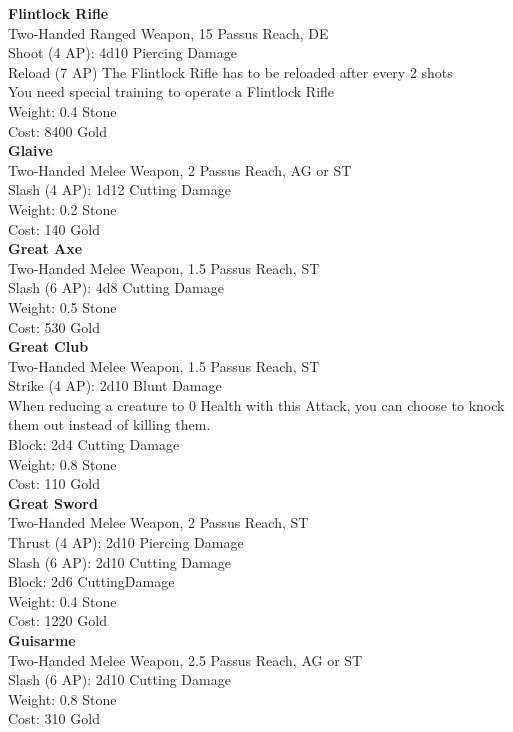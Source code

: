 \textbf{Flintlock Rifle}\\
Two-Handed Ranged Weapon, 15 Passus Reach, DE\\
Shoot (4 AP): 4d10 Piercing Damage\\
Reload (7 AP) The Flintlock Rifle has to be reloaded after every 2 shots\\
You need special training to operate a Flintlock Rifle\\
Weight: 0.4 Stone\\
Cost: 8400 Gold\\

\textbf{Glaive}\\
Two-Handed Melee Weapon, 2 Passus Reach, AG or ST\\
Slash (4 AP): 1d12 Cutting Damage\\
Weight: 0.2 Stone\\
Cost: 140 Gold\\


\textbf{Great Axe}\\
Two-Handed Melee Weapon, 1.5 Passus Reach, ST\\
Slash (6 AP): 4d8 Cutting Damage\\
Weight: 0.5 Stone\\
Cost: 530 Gold\\

\textbf{Great Club}\\
Two-Handed Melee Weapon, 1.5 Passus Reach, ST\\
Strike (4 AP): 2d10 Blunt Damage\\
When reducing a creature to 0 Health with this Attack, you can choose to knock them out instead of killing them.\\
Block: 2d4 Cutting Damage\\
Weight: 0.8 Stone\\
Cost: 110 Gold\\


\textbf{Great Sword}\\
Two-Handed Melee Weapon, 2 Passus Reach, ST\\
Thrust (4 AP): 2d10 Piercing Damage\\
Slash (6 AP): 2d10 Cutting Damage\\
Block: 2d6 CuttingDamage\\
Weight: 0.4 Stone\\
Cost: 1220 Gold\\


\textbf{Guisarme}\\
Two-Handed Melee Weapon, 2.5 Passus Reach, AG or ST\\
Slash (6 AP): 2d10 Cutting Damage\\
Weight: 0.8 Stone\\
Cost: 310 Gold\\


